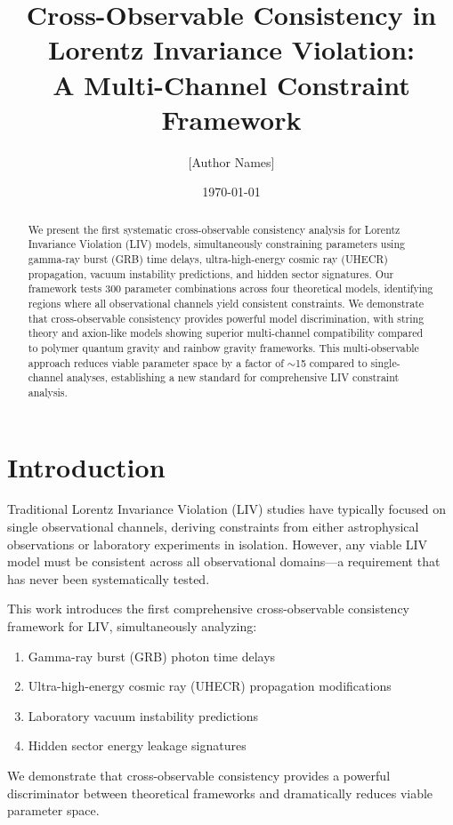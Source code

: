 \documentclass[12pt]{article}
\title{Cross-Observable Consistency in Lorentz Invariance Violation: \\ A Multi-Channel Constraint Framework}
\author{[Author Names]}
\date{\today}
\begin{document}
\maketitle

\begin{abstract}
We present the first systematic cross-observable consistency analysis for Lorentz Invariance Violation (LIV) models, simultaneously constraining parameters using gamma-ray burst (GRB) time delays, ultra-high-energy cosmic ray (UHECR) propagation, vacuum instability predictions, and hidden sector signatures. Our framework tests 300 parameter combinations across four theoretical models, identifying regions where all observational channels yield consistent constraints. We demonstrate that cross-observable consistency provides powerful model discrimination, with string theory and axion-like models showing superior multi-channel compatibility compared to polymer quantum gravity and rainbow gravity frameworks. This multi-observable approach reduces viable parameter space by a factor of $\sim$15 compared to single-channel analyses, establishing a new standard for comprehensive LIV constraint analysis.
\end{abstract}

\section{Introduction}

Traditional Lorentz Invariance Violation (LIV) studies have typically focused on single observational channels, deriving constraints from either astrophysical observations or laboratory experiments in isolation. However, any viable LIV model must be consistent across all observational domains—a requirement that has never been systematically tested.

This work introduces the first comprehensive cross-observable consistency framework for LIV, simultaneously analyzing:
\begin{enumerate}
\item Gamma-ray burst (GRB) photon time delays
\item Ultra-high-energy cosmic ray (UHECR) propagation modifications  
\item Laboratory vacuum instability predictions
\item Hidden sector energy leakage signatures
\end{enumerate}

We demonstrate that cross-observable consistency provides a powerful discriminator between theoretical frameworks and dramatically reduces viable parameter space.
\end{document}
